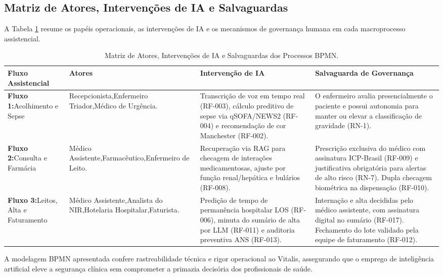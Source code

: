 \subsection{Matriz de Atores, Intervenções de IA e Salvaguardas}
\label{subsec:bpmn_matriz}

A Tabela \ref{tab:matriz_bpmn} resume os papéis operacionais, as intervenções de IA e os mecanismos de governança humana em cada macroprocesso assistencial.

\begin{table}[H]
\centering
\small
\renewcommand{\arraystretch}{1.2}
\begin{tabularx}{\textwidth}{>{\raggedright\arraybackslash}p{2.8cm} >{\raggedright\arraybackslash}p{2.8cm} >{\raggedright\arraybackslash}p{4.6cm} >{\raggedright\arraybackslash}X}
\toprule
\textbf{Fluxo Assistencial} & \textbf{Atores} & \textbf{Intervenção de IA} & \textbf{Salvaguarda de Governança} \\
\midrule
\textbf{Fluxo 1:}\newline Acolhimento e Sepse &
Recepcionista,\newline Enfermeiro Triador,\newline Médico de Urgência. &
Transcrição de voz em tempo real (RF-003), cálculo preditivo de sepse via qSOFA/NEWS2 (RF-004) e recomendação de cor Manchester (RF-002). &
O enfermeiro avalia presencialmente o paciente e possui autonomia para manter ou elevar a classificação de gravidade (RN-1). \\
\midrule
\textbf{Fluxo 2:}\newline Consulta e Farmácia &
Médico Assistente,\newline Farmacêutico,\newline Enfermeiro de Leito. &
Recuperação via RAG para checagem de interações medicamentosas, ajuste por função renal/hepática e bulários (RF-008). &
Prescrição exclusiva do médico com assinatura ICP-Brasil (RF-009) e justificativa obrigatória para alertas de alto risco (RN-7). Dupla checagem biométrica na dispensação (RF-010). \\
\midrule
\textbf{Fluxo 3:}\newline Leitos, Alta e Faturamento &
Médico Assistente,\newline Analista do NIR,\newline Hotelaria Hospitalar,\newline Faturista. &
Predição de tempo de permanência hospitalar LOS (RF-006), minuta do sumário de alta por LLM (RF-011) e auditoria preventiva ANS (RF-013). &
Internação e alta decididas pelo médico assistente, com assinatura digital no sumário (RF-017). Fechamento do lote validado pela equipe de faturamento (RF-012). \\
\bottomrule
\end{tabularx}
\caption{Matriz de Atores, Intervenções de IA e Salvaguardas dos Processos BPMN.}
\label{tab:matriz_bpmn}
\end{table}

A modelagem BPMN apresentada confere rastreabilidade técnica e rigor operacional ao Vitalis, assegurando que o emprego de inteligência artificial eleve a segurança clínica sem comprometer a primazia decisória dos profissionais de saúde.
